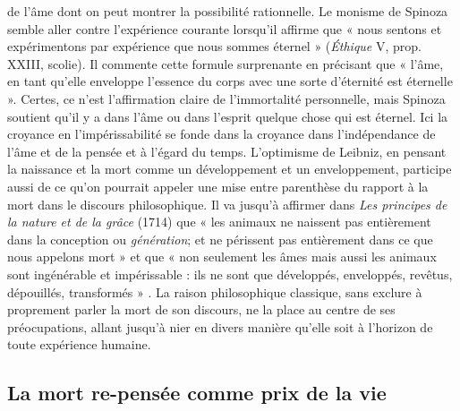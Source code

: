 de l'âme dont on peut montrer la possibilité rationnelle. Le monisme de Spinoza semble aller contre l'expérience courante lorsqu'il affirme que « nous sentons et expérimentons par expérience que nous sommes éternel » ({\it Éthique} V, prop. XXIII, scolie). Il commente cette formule surprenante en précisant que « l'âme, en tant qu'elle enveloppe l'essence du corps avec une sorte d'éternité est éternelle ». Certes, ce n'est l'affirmation claire de l'immortalité personnelle, mais Spinoza soutient qu'il y a dans l'âme ou dans l'esprit quelque chose qui est éternel. Ici la croyance en l'impérissabilité se fonde dans la croyance dans l'indépendance de l'âme et de la pensée et à l'égard du temps. L'optimisme de Leibniz, en pensant la naissance et la mort comme un développement et un enveloppement, participe aussi de ce qu'on pourrait appeler une mise entre parenthèse du rapport à la mort dans le discours philosophique. Il va jusqu'à affirmer dans {\it Les principes de la nature et de la grâce} (1714) que « les animaux ne naissent pas entièrement dans la conception ou {\it génération}; et ne périssent pas entièrement dans ce que nous appelons mort » et que « non seulement les âmes mais aussi les animaux sont ingénérable et impérissable : ils ne sont que développés, enveloppés, revêtus, dépouillés, transformés » . La raison philosophique classique, sans exclure à proprement parler la mort de son discours, ne la place au centre de ses préocupations, allant jusqu'à nier en divers manière qu'elle soit à l'horizon de toute expérience humaine.

\subsection{La mort re-pensée comme prix de la vie}

